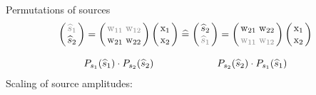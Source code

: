 \begin{frame}
Permutations of sources
{\footnotesize
\begin{equation*}
	\arraycolsep=1.4pt%
	\begin{array}{ccc}
	\left( \begin{array}{ll}
		\textcolor{gray}{\widehat{s}_1} \\ \widehat{s}_2
	\end{array} \right)
	=
	\left( \begin{array}{ll}
	\textcolor{gray}{\mathrm{w}_{11}} & \textcolor{gray}{\mathrm{w}_{12}} \\
		\mathrm{w}_{21} & \mathrm{w}_{22} 
	\end{array} \right)
	\left( \begin{array}{ll}
		\mathrm{x}_1 \\ \mathrm{x}_2
	\end{array} \right)
	& \corresponds &
	\left( \begin{array}{ll}
		\widehat{s}_2 \\ \textcolor{gray}{\widehat{s}_1}
	\end{array} \right)
	 = 
	\left( \begin{array}{ll}
		\mathrm{w}_{21} & \mathrm{w}_{22} \\
		\textcolor{gray}{\mathrm{w}_{11}} & \textcolor{gray}{\mathrm{w}_{12}} 
	\end{array} \right)
	\left( \begin{array}{ll}
		\mathrm{x}_1 \\ \mathrm{x}_2
	\end{array} \right)
	\\\\
	P_{s_1} (\widehat{s}_1) \cdot P_{s_2} (\widehat{s}_2)
	&& 
	P_{s_2} (\widehat{s}_2) \cdot P_{s_1} (\widehat{s}_1)
	\end{array}
\end{equation*}
}
Scaling of source amplitudes:


\end{frame}
